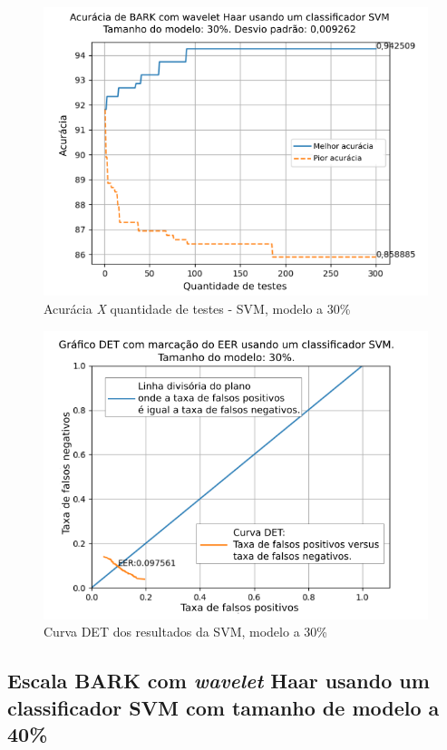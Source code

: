 			\begin{figure}[ht]
				\centering
				\includegraphics[width=\linewidth]{images/results/confusionMatrices/classifier_SVM_30.png}
				\caption{Acurácia \textit{X} quantidade de testes - SVM, modelo a 30\%}
				\label{fig:classifiersvm30}
			\end{figure}
		
			\begin{figure}[h]
				\centering
				\includegraphics[width=\linewidth]{images/results/det/DET_SVM_30}
				\caption{Curva DET dos resultados da SVM, modelo a 30\%}
				\label{fig:detsvm30}
			\end{figure}
	
			\FloatBarrier
		\subsection{Escala BARK com \textit{wavelet} Haar usando um classificador SVM com tamanho de modelo a 40\%}
			
			
